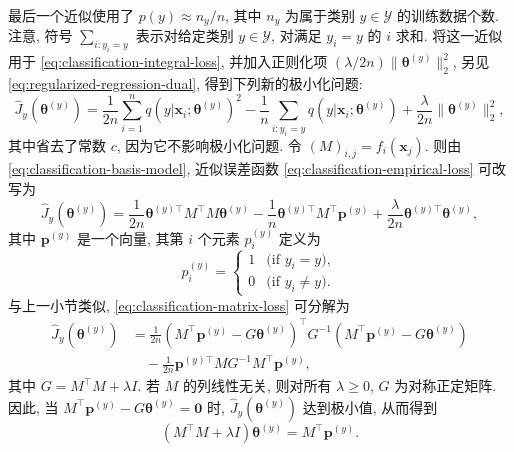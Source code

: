 {最后一个近似使用了 $p(y)\approx n_y/n$, 其中 $n_y$ 为属于类别 $y\in\mathcal{Y}$ 的训练数据个数. 注意, 符号 $\sum_{i:y_i=y}$ 表示对给定类别 $y\in\mathcal{Y}$, 对满足 $y_i=y$ 的 $i$ 求和. 将这一近似用于 \eqref{eq:classification-integral-loss}, 并加入正则化项 $(\lambda/2n)\|\boldsymbol{\theta}^{(y)}\|_2^2$, 另见 \eqref{eq:regularized-regression-dual}, 得到下列新的极小化问题:}
\begin{equation}\label{eq:classification-empirical-loss}
\widehat J_y(\boldsymbol{\theta}^{(y)})=\frac1{2n}\sum_{i=1}^nq(y|\boldsymbol{x}_i;\boldsymbol{\theta}^{(y)})^2-\frac1n\sum_{i:y_i=y}q(y|\boldsymbol{x}_i;\boldsymbol{\theta}^{(y)})+\frac\lambda{2n}\|\boldsymbol{\theta}^{(y)}\|_2^2,
\end{equation}
{其中省去了常数 $c$, 因为它不影响极小化问题. 令 $(M)_{i,j}=f_i(\boldsymbol{x}_j)$. 则由 \eqref{eq:classification-basis-model}, 近似误差函数 \eqref{eq:classification-empirical-loss} 可改写为}
\begin{equation}\label{eq:classification-matrix-loss}
\widehat J_y(\boldsymbol{\theta}^{(y)})=\frac1{2n}\boldsymbol{\theta}^{(y)\top}M^{\top}M\boldsymbol{\theta}^{(y)}-\frac1n\boldsymbol{\theta}^{(y)\top}M^{\top}\boldsymbol{p}^{(y)}+\frac\lambda{2n}\boldsymbol{\theta}^{(y)\top}\boldsymbol{\theta}^{(y)},
\end{equation}
{其中 $\boldsymbol{p}^{(y)}$ 是一个向量, 其第 $i$ 个元素 $p_i^{(y)}$ 定义为}
\[p_i^{(y)}=\begin{cases}1&\text{(if }y_i=y),\\0&\text{(if }y_i\ne y).\end{cases}\]
{与上一小节类似, \eqref{eq:classification-matrix-loss} 可分解为}
\[\begin{aligned}
\widehat J_y(\boldsymbol{\theta}^{(y)})&=\frac1{2n}\left(M^{\top}\boldsymbol{p}^{(y)}-G\boldsymbol{\theta}^{(y)}\right)^{\top}G^{-1}\left(M^{\top}\boldsymbol{p}^{(y)}-G\boldsymbol{\theta}^{(y)}\right)\\
&\quad-\frac1{2n}\boldsymbol{p}^{(y)\top}MG^{-1}M^{\top}\boldsymbol{p}^{(y)},
\end{aligned}\]
{其中 $G=M^{\top}M+\lambda I$. 若 $M$ 的列线性无关, 则对所有 $\lambda\ge0$, $G$ 为对称正定矩阵. 因此, 当 $M^{\top}\boldsymbol{p}^{(y)}-G\boldsymbol{\theta}^{(y)}=\boldsymbol{0}$ 时, $\widehat J_y(\boldsymbol{\theta}^{(y)})$ 达到极小值, 从而得到}
\begin{equation}\label{eq:classification-normal-equations}
(M^{\top}M+\lambda I)\boldsymbol{\theta}^{(y)}=M^{\top}\boldsymbol{p}^{(y)}.
\end{equation}
